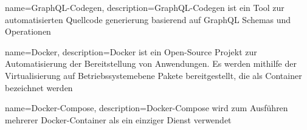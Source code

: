 {   name={GraphQL-Codegen},
    description={GraphQL-Codegen ist ein Tool zur automatisierten Quellcode generierung basierend auf GraphQL Schemas und Operationen}
}

{   name={Docker},
    description={Docker ist ein Open-Source Projekt zur Automatisierung der Bereitstellung von Anwendungen. Es werden mithilfe der Virtualisierung auf Betriebssystemebene Pakete bereitgestellt, die als Container bezeichnet werden}
}

{   name={Docker-Compose},
    description={Docker-Compose wird zum Ausführen mehrerer Docker-Container als ein einziger Dienst verwendet}
}

